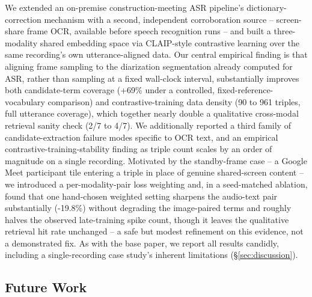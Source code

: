 ﻿\documentclass[twocolumn]{article}
\begin{document}
We extended an on-premise construction-meeting ASR pipeline's dictionary-correction mechanism with
a second, independent corroboration source -- screen-share frame OCR, available before speech
recognition runs -- and built a three-modality shared embedding space via CLAIP-style contrastive
learning over the same recording's own utterance-aligned data. Our central empirical finding is
that aligning frame sampling to the diarization segmentation already computed for ASR, rather than
sampling at a fixed wall-clock interval, substantially improves both candidate-term coverage (+69\%
under a controlled, fixed-reference-vocabulary comparison) and contrastive-training data density
(90 to 961 triples, full utterance coverage), which together nearly double a qualitative cross-modal
retrieval sanity check (2/7 to 4/7). We additionally reported a third family of candidate-extraction
failure modes specific to OCR text, and an empirical contrastive-training-stability finding as
triple count scales by an order of magnitude on a single recording. Motivated by the standby-frame
case -- a Google Meet participant tile entering a triple in place of genuine shared-screen content
-- we introduced a per-modality-pair loss weighting and, in a seed-matched ablation, found that one
hand-chosen weighted setting sharpens the audio-text pair substantially (-19.8\%) without degrading
the image-paired terms and roughly halves the observed late-training spike count, though it leaves
the qualitative retrieval hit rate unchanged -- a safe but modest refinement on this evidence, not a
demonstrated fix. As with the base paper, we
report all results candidly, including a single-recording case study's inherent limitations
(\S\ref{sec:discussion}).

\subsection{Future Work}
\end{document}
